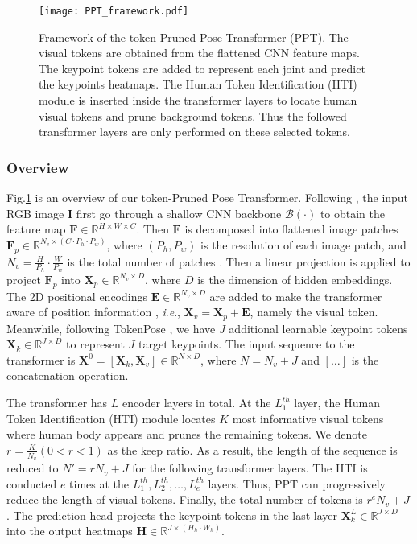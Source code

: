\documentclass[runningheads]{llncs}
\newcommand{\ie}{\textit{i}.\textit{e}., }
\begin{document}
\begin{figure}[!t]
    \centering
    \texttt{[image: PPT\_framework.pdf]}
    \caption{\small{Framework of the token-Pruned Pose Transformer (PPT). 
    The visual tokens are obtained from the flattened CNN feature maps. The keypoint tokens are added to represent each joint and predict the keypoints heatmaps. The Human Token Identification (HTI) module is inserted inside the transformer layers to locate human visual tokens and prune background tokens. Thus the followed transformer layers are only performed on these selected tokens. }  }
    \label{fig:2D_prune_framework}
\end{figure}


\subsubsection{Overview}
Fig.\ref{fig:2D_prune_framework} is an overview of our token-Pruned Pose Transformer. 
Following \cite{li2021tokenpose}, the input RGB image $\mathbf{I}$ first go through a shallow CNN backbone $\mathcal{B}(\cdot)$ to obtain the feature map $\mathbf{F} \in  \mathbb{R}^{ H \times W \times C}$.
Then $\mathbf{F}$ is decomposed into flattened image patches $\mathbf{F}_p \in \mathbb{R}^{N_v \times (C \cdot P_h \cdot P_w) }$, where $(P_h, P_w)$ is the resolution of each image patch, and $ N_v = \frac{H}{P_h} \cdot \frac{W}{P_w}$ is the total number of patches \cite{dosovitskiy2020image}. Then a linear projection is applied to project $\mathbf{F}_p$ into $\mathbf{X}_p \in \mathbb{R}^{N_v \times D}$, where $D$ is the dimension of hidden embeddings.
The 2D positional encodings $\mathbf{E} \in \mathbb{R}^{N_v \times D}$ are added to make the transformer aware of position information \cite{vaswani2017attention}, \ie  $\mathbf{X}_v = \mathbf{X}_p + \mathbf{E}$, namely the visual token.
Meanwhile, following TokenPose \cite{li2021tokenpose}, we have $J$ additional learnable keypoint tokens $\mathbf{X}_k \in \mathbb{R}^{J \times D}$ to represent $J$ target keypoints. 
The input sequence to the transformer is $\mathbf{X}^0 = [\mathbf{X}_k, \mathbf{X}_v] \in  \mathbb{R}^{N \times D}$, where $N = N_v + J$ and $[\ldots]$ is the concatenation operation.   

The transformer has $L$ encoder layers in total. 
At the $L_1^{th}$ layer, the Human Token Identification (HTI) module locates $K$ most informative visual tokens where human body appears and prunes the remaining tokens. 
We denote $r=\frac{K}{N_v} (0<r<1)$ as the keep ratio.
As a result, the length of the sequence is reduced to $N'=rN_v+J$ for the following transformer layers.  
The HTI is conducted $e$ times at the $L_1^{th}, L_2^{th}, \ldots, L_e^{th}$ layers. 
Thus, PPT can progressively reduce the length of visual tokens. 
Finally, the total number of tokens is $r^e N_v + J$. 
The prediction head projects the keypoint tokens in the last layer $\mathbf{X}_k^L \in \mathbb{R}^{J\times D}$ into the output heatmaps $\mathbf{H} \in \mathbb{R}^{J\times (H_h\cdot W_h)}$. 
\end{document}
